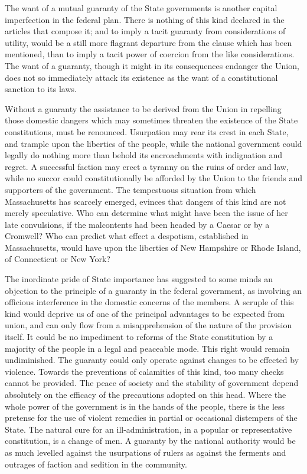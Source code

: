 The want of a mutual guaranty of the State governments is another capital imperfection in the federal plan. 
There is nothing of this kind declared in the articles that compose it; and to imply a tacit guaranty from considerations of utility, would be a still more flagrant departure from the clause which has been mentioned, than to imply a tacit power of coercion from the like considerations. 
The want of a guaranty, though it might in its consequences endanger the Union, does not so immediately attack its existence as the want of a constitutional sanction to its laws.

Without a guaranty the assistance to be derived from the Union in repelling those domestic dangers which may sometimes threaten the existence of the State constitutions, must be renounced. 
Usurpation may rear its crest in each State, and trample upon the liberties of the people, while the national government could legally do nothing more than behold its encroachments with indignation and regret. 
A successful faction may erect a tyranny on the ruins of order and law, while no succor could constitutionally be afforded by the Union to the friends and supporters of the government. 
The tempestuous situation from which Massachusetts has scarcely emerged, evinces that dangers of this kind are not merely speculative. 
Who can determine what might have been the issue of her late convulsions, if the malcontents had been headed by a Caesar or by a Cromwell? 
Who can predict what effect a despotism, established in Massachusetts, would have upon the liberties of New Hampshire or Rhode Island, of Connecticut or New York?

The inordinate pride of State importance has suggested to some minds an objection to the principle of a guaranty in the federal government, as involving an officious interference in the domestic concerns of the members. 
A scruple of this kind would deprive us of one of the principal advantages to be expected from union, and can only flow from a misapprehension of the nature of the provision itself. 
It could be no impediment to reforms of the State constitution by a majority of the people in a legal and peaceable mode. 
This right would remain undiminished. 
The guaranty could only operate against changes to be effected by violence. 
Towards the preventions of calamities of this kind, too many checks cannot be provided. 
The peace of society and the stability of government depend absolutely on the efficacy of the precautions adopted on this head. 
Where the whole power of the government is in the hands of the people, there is the less pretense for the use of violent remedies in partial or occasional distempers of the State. 
The natural cure for an ill-administration, in a popular or representative constitution, is a change of men. 
A guaranty by the national authority would be as much levelled against the usurpations of rulers as against the ferments and outrages of faction and sedition in the community.

